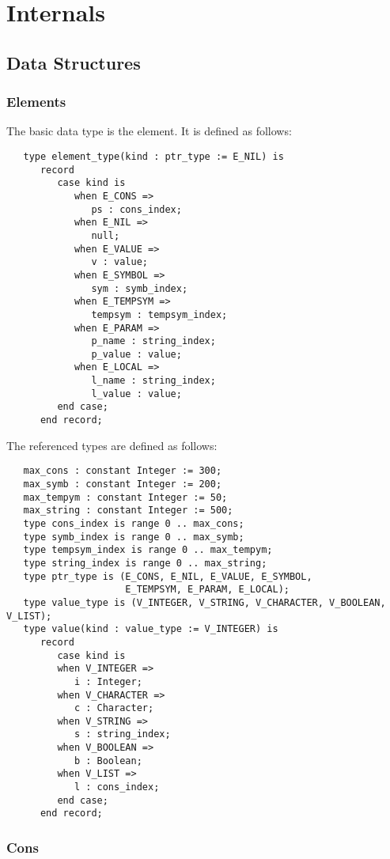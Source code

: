 \documentclass[10pt, openany]{book}
\begin{document}
\section{Internals}
\subsection{Data Structures}
\subsubsection{Elements}
The basic data type is the element.  It is defined as follows:
\lstset{language=Ada}
\begin{lstlisting}
   type element_type(kind : ptr_type := E_NIL) is
      record
         case kind is
            when E_CONS =>
               ps : cons_index;
            when E_NIL =>
               null;
            when E_VALUE =>
               v : value;
            when E_SYMBOL =>
               sym : symb_index;
            when E_TEMPSYM =>
               tempsym : tempsym_index;
            when E_PARAM =>
               p_name : string_index;
               p_value : value;
            when E_LOCAL =>
               l_name : string_index;
               l_value : value;
         end case;
      end record;
\end{lstlisting}
The referenced types are defined as follows:
\begin{lstlisting}
   max_cons : constant Integer := 300;
   max_symb : constant Integer := 200;
   max_tempym : constant Integer := 50;
   max_string : constant Integer := 500;
   type cons_index is range 0 .. max_cons;
   type symb_index is range 0 .. max_symb;
   type tempsym_index is range 0 .. max_tempym;
   type string_index is range 0 .. max_string;
   type ptr_type is (E_CONS, E_NIL, E_VALUE, E_SYMBOL,
                     E_TEMPSYM, E_PARAM, E_LOCAL);
   type value_type is (V_INTEGER, V_STRING, V_CHARACTER, V_BOOLEAN, V_LIST);
   type value(kind : value_type := V_INTEGER) is
      record
         case kind is
         when V_INTEGER =>
            i : Integer;
         when V_CHARACTER =>
            c : Character;
         when V_STRING =>
            s : string_index;
         when V_BOOLEAN =>
            b : Boolean;
         when V_LIST =>
            l : cons_index;
         end case;
      end record;

\end{lstlisting}

\subsubsection{Cons}
\end{document}
